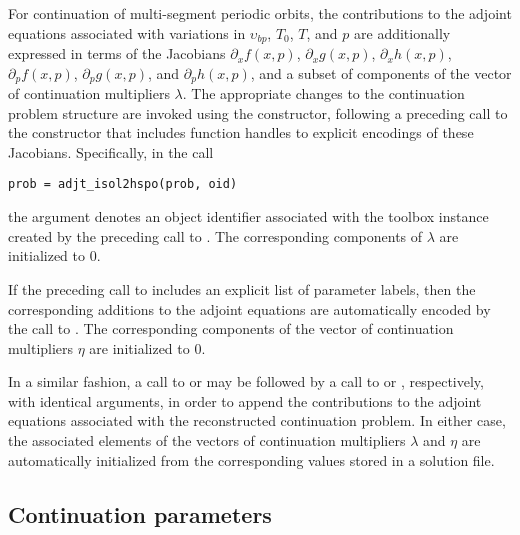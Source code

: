 For continuation of multi-segment periodic orbits, the contributions to the adjoint equations associated with variations in $\upsilon_{bp}$, $T_0$, $T$, and $p$ are additionally expressed in terms of the Jacobians $\partial_x f(x,p)$, $\partial_x g(x,p)$, $\partial_x h(x,p)$, $\partial_p f(x,p)$, $\partial_p g(x,p)$, and $\partial_p h(x,p)$, and a subset of components of the vector of continuation multipliers $\lambda$. The appropriate changes to the continuation problem structure are invoked using the  constructor, following a preceding call to the  constructor that includes function handles to explicit encodings of these Jacobians.  Specifically, in the call
\begin{lstlisting}[language=coco-highlight]
prob = adjt_isol2hspo(prob, oid)
\end{lstlisting}
the  argument denotes an object identifier associated with the toolbox instance created by the preceding call to . The corresponding components of $\lambda$ are initialized to $0$.

If the preceding call to  includes an explicit list of parameter labels, then the corresponding additions to the adjoint equations are automatically encoded by the call to . The corresponding components of the vector of continuation multipliers $\eta$ are initialized to $0$.

In a similar fashion, a call to  or  may be followed by a call to  or , respectively, with identical arguments, in order to append the contributions to the adjoint equations associated with the reconstructed continuation problem. In either case, the associated elements of the vectors of continuation multipliers $\lambda$ and $\eta$ are automatically initialized from the corresponding values stored in a solution file.


\subsection{Continuation parameters}

